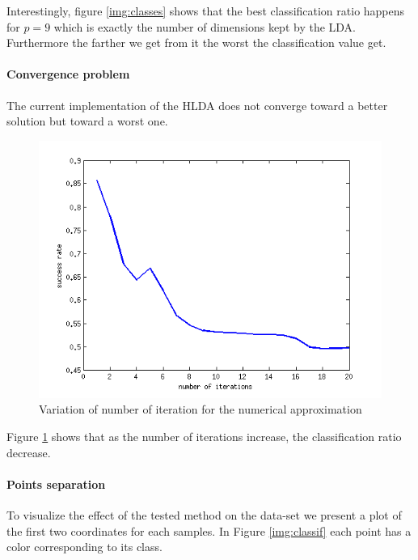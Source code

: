 Interestingly, figure \ref{img:classes} shows that the best
classification ratio happens for $p = 9$ which is exactly the number
of dimensions kept by the LDA. Furthermore the farther we get from it
the worst the classification value get.

\paragraph{Convergence problem} The current implementation of the HLDA does not converge toward a better
solution but toward a worst one.

\begin{figure}[H!]
  \includegraphics[scale=0.75]{img/bench-iterations}
  \caption{Variation of number of iteration for the numerical approximation}
  \label{img:iter}
\end{figure}

Figure \ref{img:iter} shows that as the number of iterations increase, the classification ratio decrease.

\paragraph{Points separation} To visualize the effect of the tested method on the data-set we present a plot
of the first two coordinates for each samples. In Figure \ref{img:classif} each point has a color corresponding to its
class.

